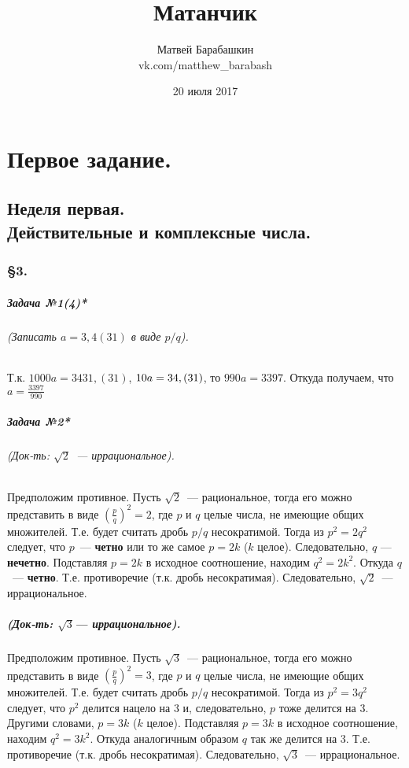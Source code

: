 \documentclass[a4paper,12pt]{report}
\author{Матвей Барабашкин\\vk.com/matthew\_barabash}
\title{Матанчик}
\date{20 июля 2017}
\newcommand*{\hm}[1]{#1\nobreak\discretionary{}
{\hbox{$\mathsurround=0pt #1$}}{}}
\begin{document}
\maketitle

\chapter{Первое задание.}

\section{Неделя первая.\\ Действительные и комплексные числа.}

\subsection*{\S3.\\}

\paragraph{Задача №1(4)*}
\subparagraph{(Записать $ a=3,4(31) $ в виде $ p/q $).}
Т.к. $ 1000a=3431,(31) $, $ 10a\hm=34,(31) $, то 
$ 990a=3397 $. Откуда получаем, что $ a=\frac{3397}{990} $

\paragraph{Задача №2*}\label{sqrt2}
\subparagraph{(Док-ть: $ \sqrt{2} $~--- иррациональное).}
Предположим противное.
Пусть $ \sqrt{2} $~--- рациональное, тогда
его можно представить в виде $ (\frac{p}{q})^2=2 $, где
$ p $ и $ q $ целые числа, не имеющие общих множителей.
Т.е. будет считать дробь $ p/q $ несократимой. Тогда
из $ p^2=2q^2 $ следует, что $ p $~--- \textbf{четно} или
то же самое $ p=2k $ ($ k $ целое). Следовательно,
$ q $ --- \textbf{нечетно}. 
Подставляя $ p=2k $ в исходное соотношение, находим
$ q^2=2k^2 $. Откуда $ q $~--- \textbf{четно}. 
Т.е. противоречие (т.к. дробь несократимая). Следовательно,
$ \sqrt{2} $~--- иррациональное.

\paragraph{(Док-ть: $ \sqrt{3} $--- иррациональное).}
Предположим противное.
Пусть $ \sqrt{3} $~--- рациональное, тогда
его можно представить в виде $ (\frac{p}{q})^2=3 $, где
$ p $ и $ q $ целые числа, не имеющие общих множителей.
Т.е. будет считать дробь $ p/q $ несократимой. Тогда
из $ p^2=3q^2 $ следует, что $ p^2 $ делится нацело на 3
и, следовательно, $ p $ тоже делится на 3.
Другими словами, $ p=3k $ ($ k $ целое).
Подставляя $ p=3k $ в исходное соотношение, находим
$ q^2=3k^2 $. Откуда аналогичным образом $ q $ так же делится на 3. 
Т.е. противоречие (т.к. дробь несократимая). Следовательно,
$ \sqrt{3} $~--- иррациональное.
\end{document}
